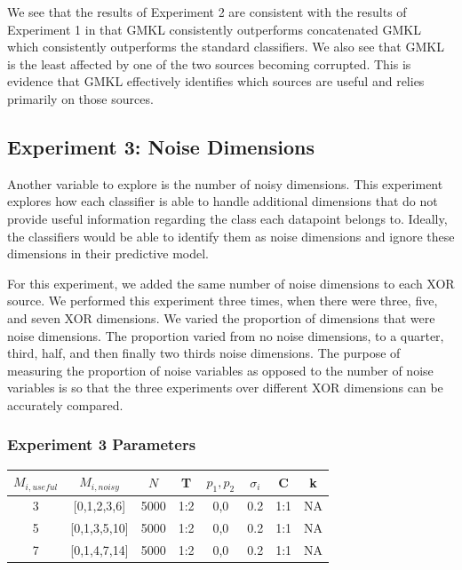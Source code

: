 \documentclass{article}
\begin{document}
We see that the results of Experiment 2 are consistent with the results of Experiment 1 in that GMKL consistently outperforms concatenated GMKL which consistently outperforms the standard classifiers. We also see that GMKL is the least affected by one of the two sources becoming corrupted. This is evidence that GMKL effectively identifies which sources are useful and relies primarily on those sources.



\subsection*{Experiment 3: Noise Dimensions}

Another variable to explore is the number of noisy dimensions. This experiment explores how each classifier is able to handle additional dimensions that do not provide useful information regarding the class each datapoint belongs to. Ideally, the classifiers would be able to identify them as noise dimensions and ignore these dimensions in their predictive model.

For this experiment, we added the same number of noise dimensions to each XOR source. We performed this experiment three times, when there were three, five, and seven XOR dimensions. We varied the proportion of dimensions that were noise dimensions. The proportion varied from no noise dimensions, to a quarter, third, half, and then finally two thirds noise dimensions. The purpose of measuring the proportion of noise variables as opposed to the number of noise variables is so that the three experiments over different XOR dimensions can be accurately compared.


\subsubsection*{Experiment 3 Parameters}
\begin{center}
\begin{tabular}{|c|c|c|c|c|c|c|c|}
\hline
$M_{i,useful}$ & $M_{i, noisy}$ & $N$ & T &  $p_1, p_2$ & $\sigma_i$ & C &  k  \\
\hline
3& [0,1,2,3,6] & 5000 &1:2 & 0,0 & 0.2 & 1:1 & NA  \\
\hline
5& [0,1,3,5,10] & 5000 &1:2 & 0,0 & 0.2 & 1:1 & NA  \\
\hline
7& [0,1,4,7,14] & 5000 &1:2 & 0,0 & 0.2 & 1:1 & NA  \\
\hline
\end{tabular}
\end{center}
\end{document}
